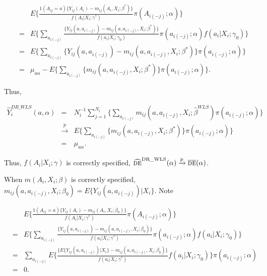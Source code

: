 \documentclass[oupdraft]{biostatistics}
\begin{document}
\begin{eqnarray*}
  &&E\Biggl\{\frac{1(A_{ij}=a)\{Y_{ij}(A_i)-m_{ij}(A_i,X_i;\beta^{\ast})\}}{{f}(A_i|X_i;\gamma^{*})}
  \pi(A_{i(-j)};\alpha)\biggr\}\\
    &=&E\Biggl\{\sum_{a_{i(-j)}}\frac{\{Y_{ij}(a,a_{i(-j)})-m_{ij}(a,a_{i(-j)},X_i;\beta^{\ast})\}}{{f}(a_i|X_i;\gamma_0)}
  \pi(a_{i(-j)};\alpha){f}(a_i|X_i;\gamma_0)\biggr\}\\
      &=&E\Biggl\{\sum_{a_{i(-j)}}\{Y_{ij}(a,a_{i(-j)})-m_{ij}(a,a_{i(-j)},X_i;\beta^{\ast})\}
  \pi(a_{i(-j)};\alpha)\biggr\}\\
  &=&\mu_{a\alpha}-E\Biggl\{\sum_{a_{i(-j)}}\{m_{ij}(a,a_{i(-j)},X_i;\beta^{\ast})\}
  \pi(a_{i(-j)};\alpha)\biggr\}.
\end{eqnarray*}

Thus, 

\begin{eqnarray*}
 \widehat{Y}_i^{DR\_WLS}(a,\alpha)&=&N_i^{-1}\sum_{j=1}^{N_i}\Biggl\{\sum_{a_{i(-j)}}m_{ij}(a,a_{i(-j)},X_i;\hat\beta^{WLS})\pi(a_{i(-j)};\alpha)
 \Biggr\}\\
 &\xrightarrow{p}&E\Biggl\{\sum_{a_{i(-j)}}\{m_{ij}(a,a_{i(-j)},X_i;\beta^{\ast})\}
  \pi(a_{i(-j)};\alpha)\biggr\}\\
  &=&\mu_{a\alpha}.
\end{eqnarray*}

\noindent Thus, $f(A_i|X_i;\gamma)$ is correctly specified, $\widehat{\textsc{de}}^{\text{DR\_WLS}}(\alpha)\xrightarrow{p}\overline{\textsc{de}}(\alpha)$.

When $m(A_i,X_i;\beta)$ is correctly specified, $m_{ij}(a,a_{i(-j)},X_i;\beta_0)=E\{Y_{ij}(a,a_{i(-j)})|X_i\}$. Note

\begin{eqnarray*}
  &&E\Biggl\{\frac{1(A_{ij}=a)\{Y_{ij}(A_i)-m_{ij}(A_i,X_i;\beta_0)\}}{{f}(A_i|X_i;\gamma^{\ast})}
  \pi(A_{i(-j)};\alpha)\biggr\}\\
    &=&E\Biggl\{\sum_{a_{i(-j)}}\frac{\{Y_{ij}(a,a_{i(-j)})-m_{ij}(a,a_{i(-j)},X_i;\beta_0)\}}{{f}(a_i|X_i;\gamma^{\ast})}
  \pi(a_{i(-j)};\alpha){f}(a_i|X_i;\gamma_0)\biggr\}\\
    &=&\sum_{a_{i(-j)}}E\Biggl\{\frac{\bigl\{E\{Y_{ij}(a,a_{i(-j)})|X_i\}-m_{ij}(a,a_{i(-j)},X_i;\beta_0)\bigr\}}{{f}(a_i|X_i;\gamma^{\ast})}
  {f}(a_i|X_i;\gamma_0)\biggr\}\pi(a_{i(-j)};\alpha)\\
  &=&0.
\end{eqnarray*}
\end{document}
